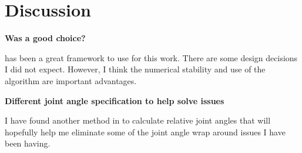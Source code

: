 
\section{Discussion}
\label{sec:Conclusion}

	\noindent \textbf{Was \bulletPhysics a good choice?}
	
	\bulletPhysics has been a great framework to use for this work. There are some design decisions I did not expect. However, I think the numerical stability and use of the \Featherstone algorithm are important advantages.

	\noindent \textbf{Different joint angle specification to help solve issues}
	
	I have found another method in \bulletPhysics to calculate relative joint angles that will hopefully help me eliminate some of the joint angle wrap around issues I have been having.
	